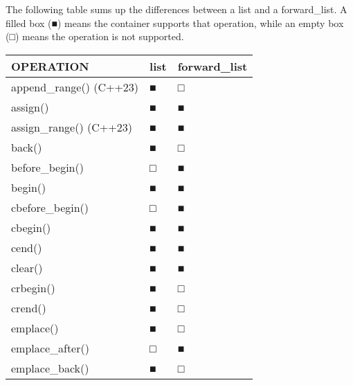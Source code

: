 The following table sums up the differences between a list and a forward\_list. A filled box (■) means the container supports that operation, while an empty box (□) means the operation is not supported.

\begin{longtable}{|l|l|l|}
\hline
\textbf{OPERATION}                           & \textbf{list} & \textbf{forward\_list} \\ \hline
\endfirsthead
%
\endhead
%
append\_range() (C++23)                      & ■             & □                      \\ \hline
assign()                                     & ■             & ■                      \\ \hline
assign\_range() (C++23)                      & ■             & ■                      \\ \hline
back()                                       & ■             & □                      \\ \hline
before\_begin()                              & □             & ■                      \\ \hline
begin()                                      & ■             & ■                      \\ \hline
cbefore\_begin()                             & □             & ■                      \\ \hline
cbegin()                                     & ■             & ■                      \\ \hline
cend()                                       & ■             & ■                      \\ \hline
clear()                                      & ■             & ■                      \\ \hline
crbegin()                                    & ■             & □                      \\ \hline
crend()                                      & ■             & □                      \\ \hline
emplace()                                    & ■             & □                      \\ \hline
emplace\_after()                             & □             & ■                      \\ \hline
emplace\_back()                              & ■             & □                      \\ \hline

\end{longtable}
